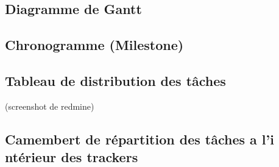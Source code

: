 \subsection{Diagramme de Gantt}
\subsection{Chronogramme (Milestone)}
\subsection{Tableau de distribution des tâches}
(screenshot de redmine)
\subsection{Camembert de répartition des tâches a l'i ntérieur des trackers}